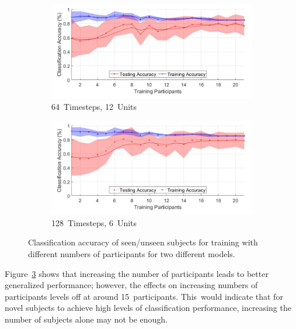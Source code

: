 \begin{figure}[!hbt]
    \centering
    \begin{subfigure}[H]{0.49\textwidth}
         \centering
        \includegraphics[width=\textwidth]{content/4-LSTM_Behaviour/results/number_participants_64x12.jpg}
        \caption{64~Timesteps, 12~Units}
        \label{fig:subject_num_generalisation_64x12}
    \end{subfigure}
    \hfil
    \begin{subfigure}[H]{0.49\textwidth}
         \centering
        \includegraphics[width=\textwidth]{content/4-LSTM_Behaviour/results/number_participants_128x6.jpg}
        \caption{128~Timesteps, 6~Units}
        \label{fig:subject_num_generalisation_128x6}
    \end{subfigure}
    \caption{Classification accuracy of seen/unseen subjects for training with different numbers of participants for two different models.}
    \label{fig:subject_num_generalisation}
\end{figure}


Figure~\ref{fig:subject_num_generalisation} shows that increasing the number of participants leads to better generalized performance; however, the effects on increasing numbers of participants levels off at around 15~participants. This~would indicate that for novel subjects to achieve high levels of classification performance, increasing the number of subjects alone may not be enough.

